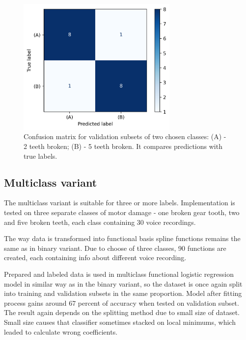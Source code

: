 \documentclass[energies,article,submit,pdftex,moreauthors]{Definitions/mdpi}
\begin{document}
\begin{figure}[H]
\centering
\includegraphics[width=0.7\textwidth]{images/confusion_matrix}
\caption{Confusion matrix for validation subsets of two chosen classes: (A) - 2 teeth broken; (B) - 5 teeth broken. It compares predictions with true labels.}
\end{figure}
\unskip
\vspace{5mm}


\subsection{Multiclass variant}

The multiclass variant is suitable for three or more labels. Implementation is tested on three separate classes of motor damage - one broken gear tooth, two and five broken teeth, each class containing 30 voice recordings.

The way data is transformed into functional basis spline functions remains the same as in binary variant. Due to choose of three classes, 90 functions are created, each containing info about different voice recording. 

Prepared and labeled data is used in multiclass functional logistic regression model in similar way as in the binary variant, so the dataset is once again split into training and validation subsets in the same proportion. Model after fitting process gains around 67 percent of accuracy when tested on validation subset. The result again depends on the splitting method due to small size of dataset. Small size causes that classifier sometimes stacked on local minimums, which leaded to calculate wrong coefficients. 
\end{document}
